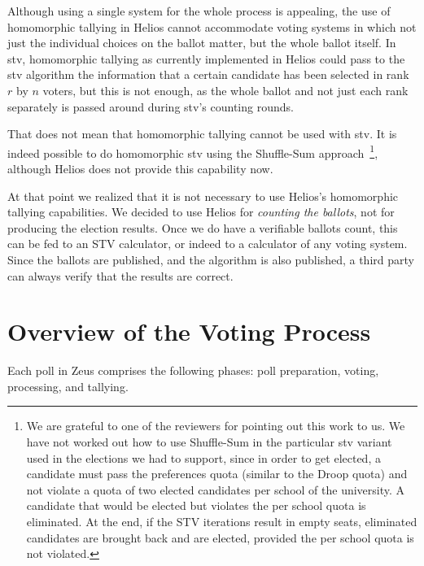 \documentclass[jets]{usenixjournal}
\begin{document}
Although using a single system for the whole process is appealing, the
use of homomorphic tallying in Helios cannot accommodate voting
systems in which not just the individual choices on the ballot matter,
but the whole ballot itself. In {\sc stv}, homomorphic tallying as
currently implemented in Helios could pass to the {\sc stv} algorithm
the information that a certain candidate has been selected in rank $r$
by $n$ voters, but this is not enough, as the whole ballot and not
just each rank separately is passed around during {\sc stv}'s counting
rounds.

That does not mean that homomorphic tallying cannot be used with {\sc
  stv}. It is indeed possible to do homomorphic {\sc stv} using the
Shuffle-Sum approach~\cite{benaloh:2009}\footnote{We are grateful to
  one of the reviewers for pointing out this work to us. We have not
  worked out how to use Shuffle-Sum in the particular {\sc stv}
  variant used in the elections we had to support, since in order to
  get elected, a candidate must pass the preferences quota (similar to
  the Droop quota) and not violate a quota of two elected candidates
  per school of the university. A candidate that would be elected but
  violates the per school quota is eliminated. At the end, if the STV
  iterations result in empty seats, eliminated candidates are brought
  back and are elected, provided the per school quota is not violated.
}, although Helios does not provide this capability now.

At that point we realized that it is not necessary to use Helios's
homomorphic tallying capabilities. We decided to use Helios for
\emph{counting the ballots}, not for producing the election results.
Once we do have a verifiable ballots count, this can be fed to an STV
calculator, or indeed to a calculator of any voting system. Since the
ballots are published, and the algorithm is also published, a third
party can always verify that the results are correct.

\section{Overview of the Voting Process}
\label{sec:voting_overview}

Each poll in Zeus comprises the following phases:
poll preparation, voting, processing, and tallying.
\end{document}
